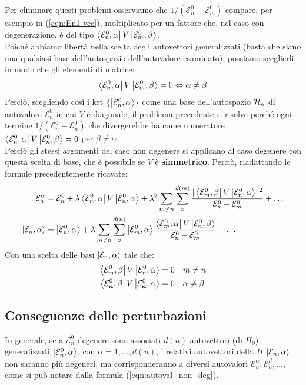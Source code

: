 \documentclass[../../FisicaTeorica.tex]{subfiles}
\begin{document}
Per eliminare questi problemi osserviamo che $1/(\mathcal{E}_n^0-\mathcal{E}^0_m)$ compare, per esempio in (\ref{eqn:En1-vec}), moltiplicato per un fattore che, nel caso con degenerazione, è del tipo $\Bra{\mathcal{E}^0_n,\alpha}V\Ket{\mathcal{E}^0_m,\beta}$.\\
Poiché abbiamo libertà nella scelta degli autovettori generalizzati (basta che siano una qualsiasi base dell'autospazio dell'autovalore esaminato), possiamo sceglierli in modo che gli elementi di matrice:
\begin{align*}
\Bra{\mathcal{E}^0_n,\alpha}V \Ket{\mathcal{E}^0_m, \beta} = 0 \Leftrightarrow \alpha \neq \beta
\end{align*}
Perciò, scegliendo così i ket $\{\Ket{\mathcal{E}_n^0, \alpha}\}$ come una base dell'autospazio $\mathcal{H}_n$ di autovalore $\mathcal{E}_n^0$ in cui $V$ è diagonale, il problema precedente si risolve perché ogni termine $1/(\mathcal{E}^0_n - \mathcal{E}^0_n)$ che divergerebbe ha come numeratore $\Bra{\mathcal{E}^0_n, \alpha}V\Ket{\mathcal{E}^0_n, \beta} = 0$ per $\beta \neq \alpha$.\\
Perciò gli stessi argomenti del caso non degenere si applicano al caso degenere con questa scelta di base, che è possibile se $V$ è \textbf{simmetrico}. Perciò, riadattando le formule precedentemente ricavate:
\begin{align}
\mathcal{E}_n^\alpha &= \mathcal{E}_n^0 + \lambda \Bra{\mathcal{E}_{n}^0, \alpha}V \Ket{\mathcal{E}_n^0, \alpha} + \lambda^2 \sum_{m\neq n} \sum_\beta^{d(m)} \frac{|\Bra{\mathcal{E}_m^0, \beta}V \Ket{\mathcal{E}^0_n,\alpha}|^2}{\mathcal{E}_n^0-\mathcal{E}^0_m} + \dots 
\label{eqn:autoval_non_deg}
\\
\Ket{\mathcal{E}_n,\alpha} &= \Ket{\mathcal{E}_n^0,\alpha} + \lambda \sum_{m\neq n} \sum_{\beta}^{d(n)} \Ket{\mathcal{E}^0_m,\alpha} \frac{{\Bra{\mathcal{E}^0_m,\alpha}V \Ket{\mathcal{E}^0_n,\beta}}}{\mathcal{E}_n^0 - \mathcal{E}_m^0} + \dots
\end{align}
Con una scelta delle basi $\Ket{\mathcal{E}_n,\alpha}$ tale che:
\begin{align*}
\Bra{\mathcal{E}_m^0, \beta}V\Ket{\mathcal{E}_n^0, \alpha}&=0 \quad m\neq n\\
\Bra{\mathcal{E}_{\bm{n}}^0, \beta}V \Ket{\mathcal{E}_{\bm{n}}^0,\alpha}&=0 \quad \alpha \neq \beta
\end{align*}

\subsection{Conseguenze delle perturbazioni}
In generale, se a $\mathcal{E}_n^0$ degenere sono associati $d(n)$ autovettori (di $H_0$) generalizzati $\Ket{\mathcal{E}^0_n, \alpha}$, con $\alpha = 1, \dots, d(n)$, i relativi autovettori della $H$  $\Ket{\mathcal{E}_n,\alpha}$ non saranno più degeneri, ma corrisponderanno a diversi autovalori  $\mathcal{E}_n^\alpha, \mathcal{E}_n^\beta,\dots$, come si può notare dalla formula (\ref{eqn:autoval_non_deg}).\\
 
\end{document}

